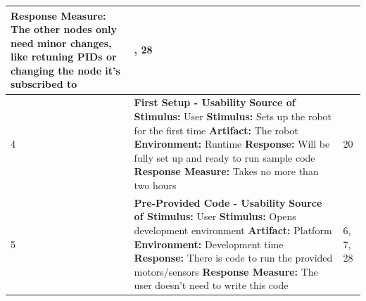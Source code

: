 \documentclass{fank1basedocument}
\begin{document}
\begin{center}
\begin{tabular}{|p{}|>{\raggedright\arraybackslash}p{}|p{}|}
				\textbf{Response Measure:} The other nodes only need minor changes, like retuning PIDs or changing the node it’s subscribed to
			& 3, 28\\
		\hline
		4 & \large{\textbf{First Setup - Usability}}\newline
				\textbf{Source of Stimulus:} User\newline
				\textbf{Stimulus:} Sets up the robot for the first time\newline
				\textbf{Artifact:} The robot\newline
				\textbf{Environment:} Runtime\newline
				\textbf{Response:} Will be fully set up and ready to run sample code\newline
				\textbf{Response Measure:} Takes no more than two hours
			& 20\\
		\hline
		5 & \large{\textbf{Pre-Provided Code - Usability}}\newline
				\textbf{Source of Stimulus:} User\newline
				\textbf{Stimulus:} Opens development environment\newline
				\textbf{Artifact:} Platform\newline
				\textbf{Environment:} Development time\newline
				\textbf{Response:} There is code to run the provided motors/sensors\newline
				\textbf{Response Measure:} The user doesn’t need to write this code
			& 6, 7, 28\\
		\hline
	\end{tabular}
\end{center}

\pagebreak
\end{document}
